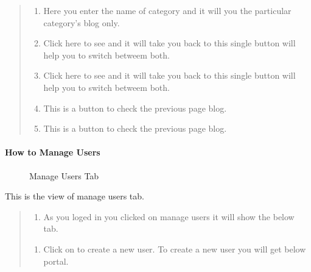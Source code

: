 \documentclass[a4paper,10pt,english]{report}
\begin{document}
\begin{quote}
\begin{enumerate}
\item {} 
Here you enter the name of category and it will you the particular category’s blog only.

\item {} 
Click here to see  and it will take you back to  this single button will help you to switch betweem both.

\item {} 
Click here to see  and it will take you back to  this single button will help you to switch betweem both.

\item {} 
This is a  button to check the previous page blog.

\item {} 
This is a  button to check the previous page blog.

\end{enumerate}
\end{quote}


\paragraph{How to Manage Users}
\label{\detokenize{mng users:how-to-manage-users}}\label{\detokenize{mng users::doc}}
\begin{figure}[htbp]
\centering
\capstart

\noindent{}
\caption{Manage Users Tab}\label{\detokenize{mng users:id6}}\label{\detokenize{mng users:id1}}\end{figure}

This is the view of manage users tab.
\begin{quote}
\begin{enumerate}
\def\theenumi{\arabic{enumi}}
\def\labelenumi{\theenumi .}
\makeatletter\def\p@enumii{\p@enumi \theenumi .}\makeatother
\item {} 
As you loged in you clicked on manage users it will show the below tab.

\end{enumerate}
\begin{enumerate}
\def\theenumi{\alph{enumi}}
\def\labelenumi{\theenumi .}
\makeatletter\def\p@enumii{\p@enumi \theenumi .}\makeatother
\item {} 
Click on  to create a new user. To create a new user you will get below portal.

\end{enumerate}
\end{quote}
\end{document}
